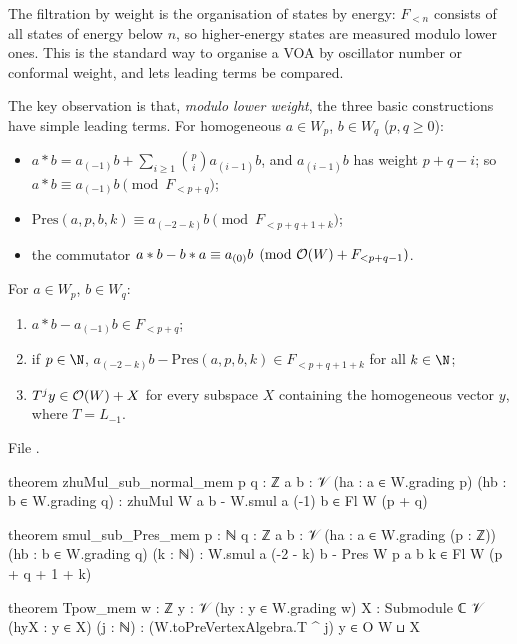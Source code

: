 \begin{physics}
The filtration by weight is the organisation of states by energy: $F_{<n}$ consists of all states of energy below $n$, so higher-energy states are measured modulo lower ones. This is the standard way to organise a VOA by oscillator number or conformal weight, and lets leading terms be compared.
\end{physics}

The key observation is that, \emph{modulo lower weight}, the three basic constructions have simple
leading terms.  For homogeneous $a\in W_p$, $b\in W_q$ ($p,q\ge0$):
\begin{itemize}
\item $a\ast b = a_{(-1)}b+\sum_{i\ge1}\binom pi a_{(i-1)}b$, and $a_{(i-1)}b$ has weight $p+q-i$; so
  $a\ast b\equiv a_{(-1)}b \pmod{F_{<p+q}}$;
\item $\mathrm{Pres}(a,p,b,k)\equiv a_{(-2-k)}b\pmod{F_{<p+q+1+k}}$;
\item the commutator $a\ast b-b\ast a\equiv a_{(0)}b\pmod{\mathcal{O}(W)+F_{<p+q-1}}$.
\end{itemize}

\begin{lemma}\label{ch12:lem:leading}
For $a\in W_p$, $b\in W_q$:
\begin{enumerate}[label=(\alph*)]
\item $a\ast b-a_{(-1)}b\in F_{<p+q}$;
\item if $p\in\N$, $a_{(-2-k)}b-\mathrm{Pres}(a,p,b,k)\in F_{<p+q+1+k}$ for all $k\in\N$;
\item $T^jy\in\mathcal{O}(W)+X$ for every subspace $X$ containing the homogeneous vector $y$, where
  $T=L_{-1}$.
\end{enumerate}
\end{lemma}
File .
\begin{leancode}
theorem zhuMul_sub_normal_mem {p q : ℤ} {a b : 𝒱} (ha : a ∈ W.grading p) (hb : b ∈ W.grading q) :
    zhuMul W a b - W.smul a (-1) b ∈ Fl W (p + q)

theorem smul_sub_Pres_mem {p : ℕ} {q : ℤ} {a b : 𝒱} (ha : a ∈ W.grading (p : ℤ))
    (hb : b ∈ W.grading q) (k : ℕ) :
    W.smul a (-2 - k) b - Pres W p a b k ∈ Fl W (p + q + 1 + k)

theorem Tpow_mem {w : ℤ} {y : 𝒱} (hy : y ∈ W.grading w) {X : Submodule ℂ 𝒱} (hyX : y ∈ X)
    (j : ℕ) : (W.toPreVertexAlgebra.T ^ j) y ∈ O W ⊔ X
\end{leancode}

